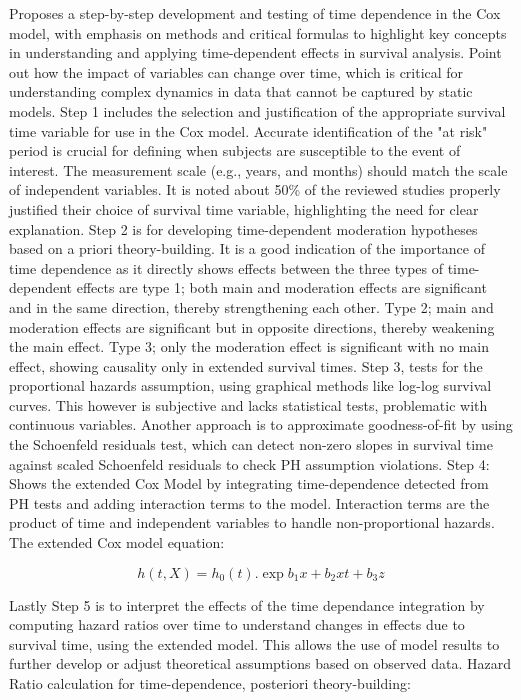 \noindent Proposes a step-by-step development and testing of time dependence in the Cox model, with emphasis on methods and critical formulas to highlight key concepts in understanding and applying time-dependent effects in survival analysis. \parencite{woo_time_2023} Point out how the impact of variables can change over time, which is critical for understanding complex dynamics in data that cannot be captured by static models. Step 1 includes the selection and justification of the appropriate survival time variable for use in the Cox model. Accurate identification of the "at risk" period is crucial for defining when subjects are susceptible to the event of interest. The measurement scale (e.g., years, and months) should match the scale of independent variables. It is noted about 50\% of the reviewed studies properly justified their choice of survival time variable, highlighting the need for clear explanation. Step 2 is for developing time-dependent moderation hypotheses based on a priori theory-building. It is a good indication of the importance of time dependence as it directly shows effects between \parencite{woo_time_2023} the three types of time-dependent effects are type 1; both main and moderation effects are significant and in the same direction, thereby strengthening each other. Type 2; main and moderation effects are significant but in opposite directions, thereby weakening the main effect. Type 3; only the moderation effect is significant with no main effect, showing causality only in extended survival times. Step 3, tests for the proportional hazards assumption, using graphical methods like log-log survival curves. \parencite{woo_time_2023} This however is subjective and lacks statistical tests, problematic with continuous variables. Another approach is to approximate goodness-of-fit by using the Schoenfeld residuals test, which can detect non-zero slopes in survival time against scaled Schoenfeld residuals to check PH assumption violations. Step 4: Shows the extended Cox Model by integrating time-dependence detected from PH tests and adding interaction terms to the model. Interaction terms are the product of time and independent variables to handle non-proportional hazards. The extended Cox model equation:

\begin{equation} \label{eq:coxtime}h(t,X) = h_{0}(t).\exp{b_{1}x+b_{2}xt+b_{3}z}\end{equation}

\noindent Lastly Step 5 is to interpret the effects of the time dependance integration by computing hazard ratios over time to understand changes in effects due to survival time, using the extended model. \parencite{woo_time_2023} This allows the use of model results to further develop or adjust theoretical assumptions based on observed data. Hazard Ratio calculation for time-dependence, posteriori theory-building: 

